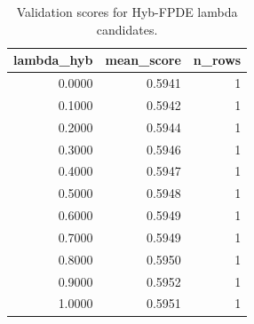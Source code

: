 \begin{table}[t]
\caption{Validation scores for Hyb-FPDE lambda candidates.}
\label{tab:lambda_distribution_computed}
\centering
\begin{tabular}{rrr}
\toprule
lambda\_hyb & mean\_score & n\_rows \\
\midrule
0.0000 & 0.5941 & 1 \\
0.1000 & 0.5942 & 1 \\
0.2000 & 0.5944 & 1 \\
0.3000 & 0.5946 & 1 \\
0.4000 & 0.5947 & 1 \\
0.5000 & 0.5948 & 1 \\
0.6000 & 0.5949 & 1 \\
0.7000 & 0.5949 & 1 \\
0.8000 & 0.5950 & 1 \\
0.9000 & 0.5952 & 1 \\
1.0000 & 0.5951 & 1 \\
\bottomrule
\end{tabular}

\end{table}
